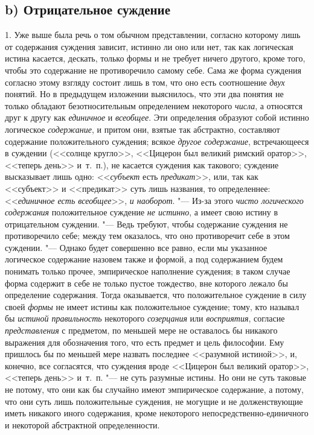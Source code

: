 \subsection[b) Отрицательное суждение]{b) Отрицательное суждение}
1. Уже выше была речь о том обычном представлении, согласно
которому лишь от содержания суждения зависит, истинно ли оно или нет, так
как логическая истина касается, дескать, только формы и не требует ничего
другого, кроме того, чтобы это содержание не противоречило самому себе.
Сама же форма суждения согласно этому взгляду состоит лишь в том, что оно
есть соотношение {\em двух}
понятий. Но в предыдущем изложении выяснилось, что эти два
понятия не только обладают безотносительным определением некоторого
{\em числа}, а относятся друг к другу как {\em единичное} и {\em всеобщее}.
Эти определения образуют собой истинно логическое {\em содержание}, и
притом они, взятые так абстрактно, составляют содержание положительного
суждения; всякое {\em другое
содержание}, встречающееся в суждении (<<солнце кругло>>,
<<Цицерон был великий римский оратор>>, <<теперь день>> и~т.~п.), не касается
суждения как такового; суждение высказывает лишь одно:
<<{\em субъект} есть {\em предикат}>>, или, так
как <<субъект>> и <<предикат>> суть лишь названия, то определеннее:
<<{\em единичное есть всеобщее}>>, {\em и наоборот}. "--- Из-за
этого {\em чисто логического содержания}
положительное суждение {\em не истинно}, а имеет
свою истину в отрицательном суждении. "--- Ведь требуют, чтобы
содержание суждения не противоречило себе; между тем оказалось, что оно
противоречит себе в этом суждении. "--- Однако будет совершенно
все равно, если мы указанное логическое содержание назовем также и формой,
а под содержанием будем понимать только прочее, эмпирическое наполнение
суждения; в таком случае форма содержит в себе не только пустое тождество,
вне которого лежало бы определение содержания. Тогда оказывается, что
положительное суждение в силу своей {\em формы} не имеет
истины как положительное суждение; тому, кто называл бы
{\em истиной правильность} некоторого {\em созерцания} или
{\em восприятия}, согласие {\em представления} с
предметом, по меньшей мере не оставалось бы никакого выражения для
обозначения того, что есть предмет и цель философии. Ему пришлось бы по
меньшей мере назвать последнее <<разумной истиной>>, и, конечно, все
согласятся, что суждения вроде <<Цицерон был великий оратор>>, <<теперь день>>
и~т.~п. "--- не суть разумные истины. Но они не суть таковые не
потому, что они как бы случайно имеют эмпирическое содержание, а потому,
что они суть лишь положительные суждения, не могущие и не долженствующие
иметь никакого иного содержания, кроме некоторого
непосредственно-единичного и некоторой абстрактной определенности.

